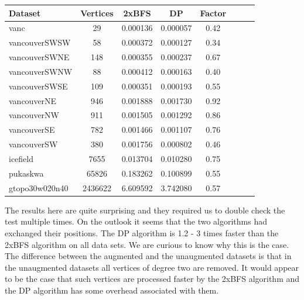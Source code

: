 \begin{center}
\begin{tabular}{l*{6}{c}r}
Dataset                & Vertices                    & 2xBFS                             & DP                    & Factor \\
\hline
vanc	               & 29    	                     & 0.000136	                         & 0.000057	              & 0.42  \\
vancouverSWSW	       & 58   	                     & 0.000372	                         & 0.000127	              & 0.34  \\
vancouverSWNE	       & 148  	                     & 0.000355	                         & 0.000237	              & 0.67  \\
vancouverSWNW	       & 88   	                     & 0.000412	                         & 0.000163	              & 0.40  \\
vancouverSWSE	       & 109  	                     & 0.000351	                         & 0.000193	              & 0.55  \\
vancouverNE	           & 946    	                 & 0.001888	                         & 0.001730	              & 0.92  \\
vancouverNW	           & 911    	                 & 0.001505	                         & 0.001292	              & 0.86  \\
vancouverSE	           & 782    	                 & 0.001466	                         & 0.001107	              & 0.76  \\
vancouverSW	           & 380    	                 & 0.001756	                         & 0.000802	              & 0.46  \\
icefield	           & 7655  	                     & 0.013704	                         & 0.010280	              & 0.75  \\
pukaskwa	           & 65826 	                     & 0.183262	                         & 0.100899	              & 0.55  \\
gtopo30w020n40	       & 2436622 	                 & 6.609592	                         & 3.742080	              & 0.57  \\

\end{tabular}
\end{center}

The results here are quite surprising and they required us to double check the test multiple times. On the outlook it seems that the two algorithms had exchanged their positions. The DP algorithm is 1.2 - 3 times faster than the 2xBFS algorithm on all data sets. We are curious to know why this is the case. The difference between the augmented and the unaugmented datasets is that in the unaugmented datasets all vertices of degree two are removed. It would appear to be the case that such vertices are processed faster by the 2xBFS algorithm and the DP algorithm has some overhead associated with them.


